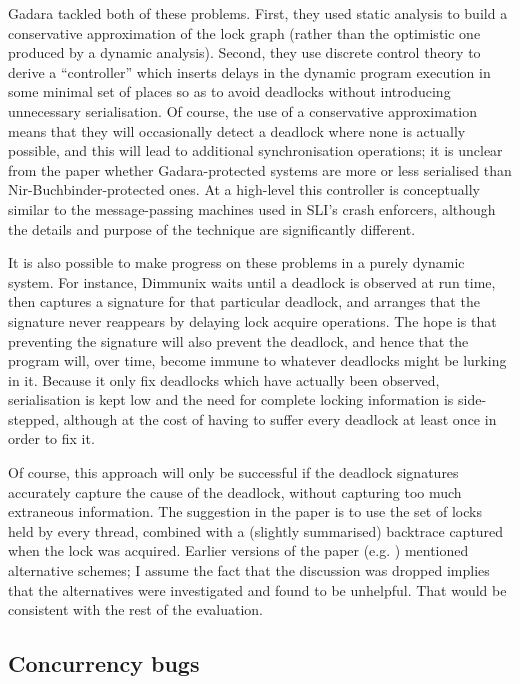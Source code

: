 Gadara\cite{Wang2008} tackled both of these problems.  First, they
used static analysis to build a conservative approximation of the lock
graph (rather than the optimistic one produced by a dynamic analysis).
Second, they use discrete control theory to derive a ``controller''
which inserts delays in the dynamic program execution in some minimal
set of places so as to avoid deadlocks without introducing unnecessary
serialisation.  Of course, the use of a conservative approximation
means that they will occasionally detect a deadlock where none is
actually possible, and this will lead to additional synchronisation
operations; it is unclear from the paper whether Gadara-protected
systems are more or less serialised than Nir-Buchbinder-protected
ones.  At a high-level this controller is conceptually similar to the
message-passing machines used in SLI's crash enforcers, although the
details and purpose of the technique are significantly different.

It is also possible to make progress on these problems in a purely
dynamic system.  For instance, Dimmunix\cite{Jula2008} waits until a
deadlock is observed at run time, then captures a signature for that
particular deadlock, and arranges that the signature never reappears
by delaying lock acquire operations.  The hope is that preventing the
signature will also prevent the deadlock, and hence that the program
will, over time, become immune to whatever deadlocks might be lurking
in it.  Because it only fix deadlocks which have actually been
observed, serialisation is kept low and the need for complete locking
information is side-stepped, although at the cost of having to suffer
every deadlock at least once in order to fix it.

Of course, this approach will only be successful if the deadlock
signatures accurately capture the cause of the deadlock, without
capturing too much extraneous information.  The suggestion in the
paper is to use the set of locks held by every thread, combined with a
(slightly summarised) backtrace captured when the lock was acquired.
Earlier versions of the paper (e.g. \cite{Jula2008b}) mentioned
alternative schemes; I assume the fact that the discussion was dropped
implies that the alternatives were investigated and found to be
unhelpful.  That would be consistent with the rest of the evaluation.


\subsection{Concurrency bugs}

